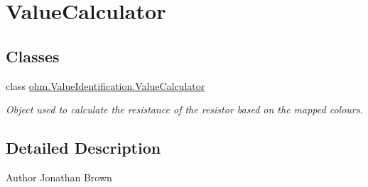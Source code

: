 \hypertarget{group___value_calculator}{}\section{Value\+Calculator}
\label{group___value_calculator}
\subsection*{Classes}
\begin{DoxyCompactItemize}
\item 
class \hyperlink{classohm_1_1_value_identification_1_1_value_calculator}{ohm.\+Value\+Identification.\+Value\+Calculator}
\begin{DoxyCompactList}\small\item\em Object used to calculate the resistance of the resistor based on the mapped colours. \end{DoxyCompactList}\end{DoxyCompactItemize}


\subsection{Detailed Description}
\begin{DoxyAuthor}{Author}
Jonathan Brown 
\end{DoxyAuthor}
